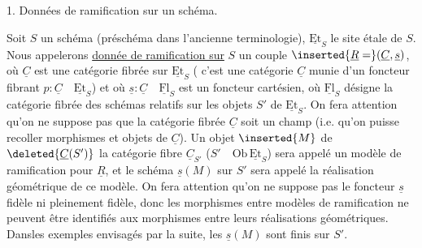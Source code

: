 1. Données de ramification sur un schéma.

Soit $S$ un schéma (préschéma dans l'ancienne terminologie), $\underline{\mathrm{Et}}_S$ le site étale de $S$. Nous appelerons \uline{donnée de ramification sur} $S$  un couple $\inserted{\underline{R}=}(\underline{C},\underline{s})$, où $\underline{C}$ est une catégorie fibrée sur $\underline{\mathrm{Et}}_S$ ( c'est une catégorie $\underline{C}$ munie d'un foncteur fibrant $p:\underline{C}\quad\underline{\mathrm{Et}}_S$) et où $\underline{s}:\underline{C}\quad\underline{\mathrm{Fl}}_S$ est un foncteur cartésien, où $\underline{\mathrm{Fl}}_S$ désigne la catégorie fibrée des  schémas relatifs sur les objets $S'$ de $\underline{\mathrm{Et}}_S$. On fera attention qu'on ne suppose pas que la catégorie fibrée $\underline{C}$ soit un champ (i.e. qu'on puisse recoller morphismes et objets de $\underline{C}$). Un objet $\inserted{M}$ de $\deleted{\underline{C}(S')}$ la catégorie fibre $\underline{C}_{S'}$ ($S'\quad\mathrm{Ob}\,\underline{\mathrm{Et}}_S$) sera appelé un modèle de ramification pour $\underline{R}$, et le schéma $\underline{s}(M)$ sur $S'$ sera appelé la réalisation géométrique de ce modèle. On fera attention qu'on ne suppose pas le foncteur $\underline{s}$ fidèle ni pleinement fidèle, donc les morphismes entre modèles de ramification ne peuvent être identifiés aux morphismes entre leurs réalisations géométriques. Dansles exemples envisagés par la suite, les $\underline{s}(M)$ sont finis sur $S'$.

